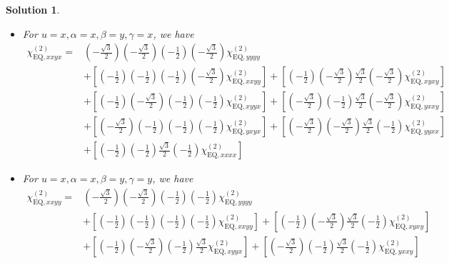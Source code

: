 \documentclass[UTF8,10pt,a4paper]{article}
\theoremstyle{Problem}
\theoremstyle{Solution}
\newtheorem*{sol}{Solution}
\begin{document}
\begin{sol}
\begin{itemize}
\begin{align}
\nonumber&\\
&
\end{align}\normalsize
\item For $u=x,\alpha=x,\beta=y,\gamma=x$, we have
\footnotesize\begin{align}
\nonumber\chi_{\text{EQ},xxyx}^{(2)}=&\left(-\frac{\sqrt{3}}{2}\right)\left(-\frac{\sqrt{3}}{2}\right)\left(-\frac{1}{2}\right)\left(-\frac{\sqrt{3}}{2}\right)\chi_{\text{EQ},yyyy}^{(2)}\\
\nonumber&+\left[\left(-\frac{1}{2}\right)\left(-\frac{1}{2}\right)\left(-\frac{1}{2}\right)\left(-\frac{\sqrt{3}}{2}\right)\chi_{\text{EQ},xxyy}^{(2)}\right]+\left[\left(-\frac{1}{2}\right)\left(-\frac{\sqrt{3}}{2}\right)\frac{\sqrt{3}}{2}\left(-\frac{\sqrt{3}}{2}\right)\chi_{\text{EQ},xyxy}^{(2)}\right]\\
\nonumber&+\left[\left(-\frac{1}{2}\right)\left(-\frac{\sqrt{3}}{2}\right)\left(-\frac{1}{2}\right)\left(-\frac{1}{2}\right)\chi_{\text{EQ},xyyx}^{(2)}\right]+\left[\left(-\frac{\sqrt{3}}{2}\right)\left(-\frac{1}{2}\right)\frac{\sqrt{3}}{2}\left(-\frac{\sqrt{3}}{2}\right)\chi_{\text{EQ},yxxy}^{(2)}\right]\\
\nonumber&+\left[\left(-\frac{\sqrt{3}}{2}\right)\left(-\frac{1}{2}\right)\left(-\frac{1}{2}\right)\left(-\frac{1}{2}\right)\chi_{\text{EQ},yxyx}^{(2)}\right]+\left[\left(-\frac{\sqrt{3}}{2}\right)\left(-\frac{\sqrt{3}}{2}\right)\frac{\sqrt{3}}{2}\left(-\frac{1}{2}\right)\chi_{\text{EQ},yyxx}^{(2)}\right]\\
&+\left[\left(-\frac{1}{2}\right)\left(-\frac{1}{2}\right)\frac{\sqrt{3}}{2}\left(-\frac{1}{2}\right)\chi_{\text{EQ},xxxx}^{(2)}\right]
\end{align}\normalsize
\item For $u=x,\alpha=x,\beta=y,\gamma=y$, we have
\footnotesize\begin{align}
\nonumber\chi_{\text{EQ},xxyy}^{(2)}=&\left(-\frac{\sqrt{3}}{2}\right)\left(-\frac{\sqrt{3}}{2}\right)\left(-\frac{1}{2}\right)\left(-\frac{1}{2}\right)\chi_{\text{EQ},yyyy}^{(2)}\\
\nonumber&+\left[\left(-\frac{1}{2}\right)\left(-\frac{1}{2}\right)\left(-\frac{1}{2}\right)\left(-\frac{1}{2}\right)\chi_{\text{EQ},xxyy}^{(2)}\right]+\left[\left(-\frac{1}{2}\right)\left(-\frac{\sqrt{3}}{2}\right)\frac{\sqrt{3}}{2}\left(-\frac{1}{2}\right)\chi_{\text{EQ},xyxy}^{(2)}\right]\\
\nonumber&+\left[\left(-\frac{1}{2}\right)\left(-\frac{\sqrt{3}}{2}\right)\left(-\frac{1}{2}\right)\frac{\sqrt{3}}{2}\chi_{\text{EQ},xyyx}^{(2)}\right]+\left[\left(-\frac{\sqrt{3}}{2}\right)\left(-\frac{1}{2}\right)\frac{\sqrt{3}}{2}\left(-\frac{1}{2}\right)\chi_{\text{EQ},yxxy}^{(2)}\right]\\

\end{align}
\end{itemize}
\end{sol}
\end{document}
